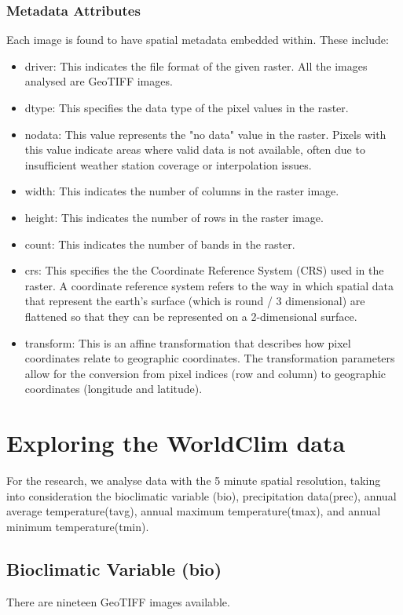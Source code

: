 \documentclass[a4paper,14pt] {report}
\begin{document}
	\subsection{Metadata Attributes}
	Each image is found to have spatial metadata embedded within. These include:
	\begin{itemize}
		\item driver: This indicates the file format of the given raster. All the images analysed are GeoTIFF images.
		\item dtype: This specifies the data type of the pixel values in the raster.
		\item nodata: This value represents the "no data" value in the raster. Pixels with this value indicate areas where valid data is not available, often due to insufficient weather station coverage or interpolation issues.
		\item width: This indicates the number of columns in the raster image.
		\item height: This indicates the number of rows in the raster image.
		\item count: This indicates the number of bands in the raster.
		\item crs: This specifies the the Coordinate Reference System (CRS) used in the raster. A coordinate reference system refers to the way in which spatial data that represent the earth’s surface (which is round / 3 dimensional) are flattened so that they can be represented on a 2-dimensional surface.
		\item transform: This is an affine transformation that describes how pixel coordinates relate to geographic coordinates. The transformation parameters allow for the conversion from pixel indices (row and column) to geographic coordinates (longitude and latitude).
	\end{itemize}
			
	\chapter{Exploring the WorldClim data}
	For the research, we analyse data with the 5 minute spatial resolution, taking into consideration the bioclimatic variable (bio),  precipitation data(prec), annual average temperature(tavg), annual maximum temperature(tmax), and annual minimum temperature(tmin). 
	
	\section{Bioclimatic Variable (bio)}
	There are nineteen GeoTIFF images available.
	
\end{document}
